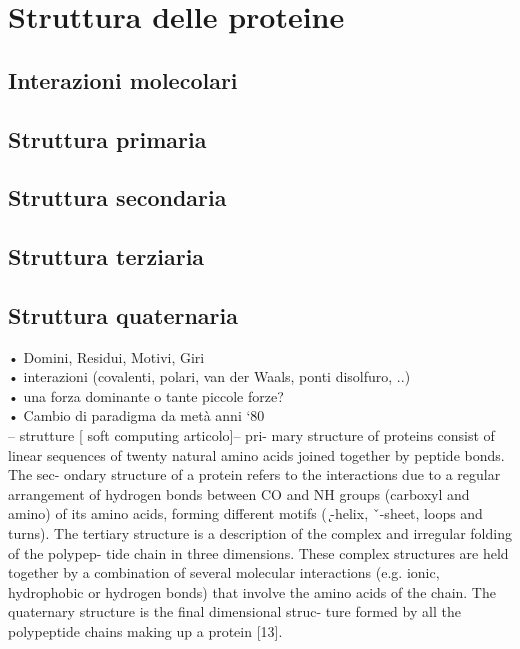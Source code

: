 \section{Struttura delle proteine}
\subsection{Interazioni molecolari}
\subsection{Struttura primaria}
\subsection{Struttura secondaria}
\subsection{Struttura terziaria}
\subsection{Struttura quaternaria}

• Domini, Residui, Motivi, Giri\\
• interazioni (covalenti, polari, van der Waals, ponti disolfuro, ..)\\
• una forza dominante o tante piccole forze?\\
• Cambio di paradigma da metà anni ‘80\\



-- strutture [ soft computing articolo]--
pri-
mary structure of proteins consist of linear sequences of twenty
natural amino acids joined together by peptide bonds. The sec-
ondary structure of a protein refers to the interactions due to
a regular arrangement of hydrogen bonds between CO and NH
groups (carboxyl and amino) of its amino acids, forming different
motifs ( ̨-helix, ˇ-sheet, loops and turns). The tertiary structure is
a description of the complex and irregular folding of the polypep-
tide chain in three dimensions. These complex structures are held
together by a combination of several molecular interactions (e.g.
ionic, hydrophobic or hydrogen bonds) that involve the amino acids
of the chain. The quaternary structure is the final dimensional struc-
ture formed by all the polypeptide chains making up a protein [13].

